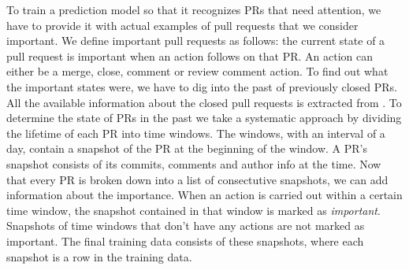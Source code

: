 To train a prediction model so that it recognizes PRs that need attention, we have to provide it with actual examples of pull requests that we consider important.
We define important pull requests as follows: the current state of a pull request is important when an action follows on that PR.
An action can either be a merge, close, comment or review comment action.
To find out what the important states were, we have to dig into the past of previously closed PRs.
All the available information about the closed pull requests is extracted from \ghtorrent.
To determine the state of PRs in the past we take a systematic approach by dividing the lifetime of each PR into time windows.
The windows, with an interval of a day, contain a snapshot of the PR at the beginning of the window.
A PR's snapshot consists of its commits, comments and author info at the time.
Now that every PR is broken down into a list of consectutive snapshots, we can add information about the importance.
When an action is carried out within a certain time window, the snapshot contained in that window is marked as \emph{important}.
Snapshots of time windows that don't have any actions are not marked as important.
The final training data consists of these snapshots, where each snapshot is a row in the training data.
